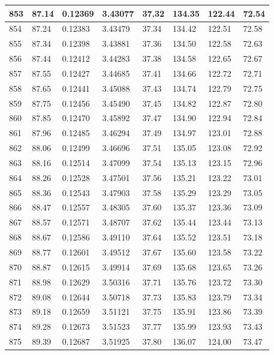 \documentclass[12pt,a4paper,twoside]{article}
\begin{document}
\begin{center}
\begin{longtable}{l l l l | l l l l}
853 & 87.14 & 0.12369 & 3.43077 & 37.32 & 134.35 & 122.44 & 72.54 \\ \hline
854 & 87.24 & 0.12383 & 3.43479 & 37.34 & 134.42 & 122.51 & 72.58 \\ \hline
855 & 87.34 & 0.12398 & 3.43881 & 37.36 & 134.50 & 122.58 & 72.63 \\ \hline
856 & 87.44 & 0.12412 & 3.44283 & 37.38 & 134.58 & 122.65 & 72.67 \\ \hline
857 & 87.55 & 0.12427 & 3.44685 & 37.41 & 134.66 & 122.72 & 72.71 \\ \hline
858 & 87.65 & 0.12441 & 3.45088 & 37.43 & 134.74 & 122.79 & 72.75 \\ \hline
859 & 87.75 & 0.12456 & 3.45490 & 37.45 & 134.82 & 122.87 & 72.80 \\ \hline
860 & 87.85 & 0.12470 & 3.45892 & 37.47 & 134.90 & 122.94 & 72.84 \\ \hline
861 & 87.96 & 0.12485 & 3.46294 & 37.49 & 134.97 & 123.01 & 72.88 \\ \hline
862 & 88.06 & 0.12499 & 3.46696 & 37.51 & 135.05 & 123.08 & 72.92 \\ \hline
863 & 88.16 & 0.12514 & 3.47099 & 37.54 & 135.13 & 123.15 & 72.96 \\ \hline
864 & 88.26 & 0.12528 & 3.47501 & 37.56 & 135.21 & 123.22 & 73.01 \\ \hline
865 & 88.36 & 0.12543 & 3.47903 & 37.58 & 135.29 & 123.29 & 73.05 \\ \hline
866 & 88.47 & 0.12557 & 3.48305 & 37.60 & 135.37 & 123.36 & 73.09 \\ \hline
867 & 88.57 & 0.12571 & 3.48707 & 37.62 & 135.44 & 123.44 & 73.13 \\ \hline
868 & 88.67 & 0.12586 & 3.49110 & 37.64 & 135.52 & 123.51 & 73.18 \\ \hline
869 & 88.77 & 0.12601 & 3.49512 & 37.67 & 135.60 & 123.58 & 73.22 \\ \hline
870 & 88.87 & 0.12615 & 3.49914 & 37.69 & 135.68 & 123.65 & 73.26 \\ \hline
871 & 88.98 & 0.12629 & 3.50316 & 37.71 & 135.76 & 123.72 & 73.30 \\ \hline
872 & 89.08 & 0.12644 & 3.50718 & 37.73 & 135.83 & 123.79 & 73.34 \\ \hline
873 & 89.18 & 0.12659 & 3.51121 & 37.75 & 135.91 & 123.86 & 73.39 \\ \hline
874 & 89.28 & 0.12673 & 3.51523 & 37.77 & 135.99 & 123.93 & 73.43 \\ \hline
875 & 89.39 & 0.12687 & 3.51925 & 37.80 & 136.07 & 124.00 & 73.47 \\ \hline

\end{longtable}
\end{center}
\end{document}
